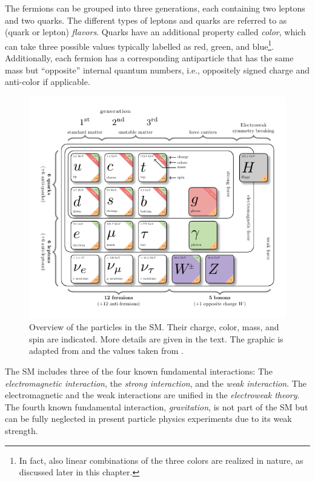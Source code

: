 The fermions can be grouped into three generations, each containing two leptons and two quarks. The different types of leptons and quarks are referred to as (quark or lepton) \emph{flavors}.
Quarks have an additional property called \emph{color}, which can take three possible values typically labelled as red, green, and blue\footnote{In fact, also linear combinations of the three colors are realized in nature, as discussed later in this chapter.}.
Additionally, each fermion has a corresponding antiparticle that has the same mass but ``opposite'' internal quantum numbers, i.e., oppositely signed charge and anti-color if applicable.
\begin{figure}[ht]
  \includegraphics[width=1\textwidth,trim=10 0 10 0]{figures/theory/particles-infographic/particles-infographic.pdf}
  \caption[Overview of particles in the SM.]{Overview of the particles in the SM. Their charge, color, mass, and spin are indicated. More details are given in the text. The graphic is adapted from  and the values taken from .}
  \label{fig:particles-infographic}
\end{figure}

The SM includes three of the four known fundamental interactions: The \emph{electromagnetic interaction}, the \emph{strong interaction}, and the \emph{weak interaction}. The electromagnetic and the weak interactions are unified in the \emph{electroweak theory}. The fourth known fundamental interaction, \emph{gravitation}, is not part of the SM but can be fully neglected in present particle physics experiments due to its weak strength.


